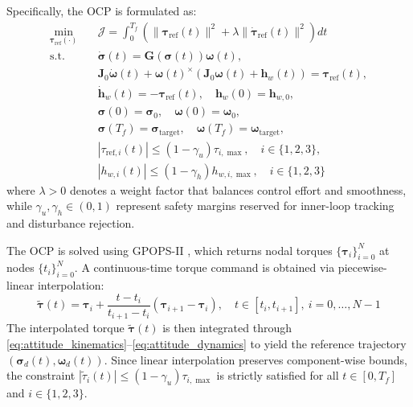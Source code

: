 \documentclass[journal]{new-aiaa}
\begin{document}
Specifically, the OCP is formulated as:
\begin{equation}
\begin{aligned}
\min_{\boldsymbol{\tau}_{\mathrm{ref}}(\cdot)} \quad &
\mathcal{J} = \int_0^{T_f} \left( \|\boldsymbol{\tau}_{\mathrm{ref}}(t)\|^2
+ \lambda \|\dot{\boldsymbol{\tau}}_{\mathrm{ref}}(t)\|^2 \right) dt \\[2pt]
\mathrm{s.t.}\quad
& \dot{\boldsymbol{\sigma}}(t) = \boldsymbol{G}(\boldsymbol{\sigma}(t)) \boldsymbol{\omega}(t), \\
& \boldsymbol{J}_0 \dot{\boldsymbol{\omega}}(t) + \boldsymbol{\omega}(t)^{\times}\!\left(\boldsymbol{J}_0 \boldsymbol{\omega}(t) + \boldsymbol{h}_w(t)\right) = \boldsymbol{\tau}_{\mathrm{ref}}(t), \\
& \dot{\boldsymbol{h}}_w(t) = -\boldsymbol{\tau}_{\mathrm{ref}}(t), \quad \boldsymbol{h}_w(0) = \boldsymbol{h}_{w,0}, \\[2pt]
& \boldsymbol{\sigma}(0) = \boldsymbol{\sigma}_0, \quad \boldsymbol{\omega}(0) = \boldsymbol{\omega}_0, \\[2pt]
& \boldsymbol{\sigma}(T_f) = \boldsymbol{\sigma}_{\mathrm{target}}, \quad \boldsymbol{\omega}(T_f) = \boldsymbol{\omega}_{\mathrm{target}}, \\[2pt]
& |{\tau}_{\mathrm{ref},i}(t)| \le (1-\gamma_u) \tau_{i,\max}, \quad i \in \{1,2,3\}, \\
& |h_{w,i}(t)| \le (1-\gamma_h) h_{w,i,\max}, \quad i \in \{1,2,3\}
\end{aligned}
\label{eq:OCP_slack}
\end{equation}
where $\lambda > 0$ denotes a weight factor that balances control effort and smoothness, while $\gamma_u, \gamma_h \in (0,1)$ represent safety margins reserved for inner-loop tracking and disturbance rejection.

The OCP is solved using GPOPS-II \cite{patterson_gpops-ii_2014},
which returns nodal torques $\{\boldsymbol{\tau}_i\}_{i=0}^N$ at nodes $\{t_i\}_{i=0}^N$. A continuous-time
torque command is obtained via piecewise-linear interpolation:
\begin{equation}
\tilde{\boldsymbol{\tau}}(t) = \boldsymbol{\tau}_i + \frac{t-t_i}{t_{i+1}-t_i}\left(\boldsymbol{\tau}_{i+1}-\boldsymbol{\tau}_i\right),
\quad t\in[t_i,t_{i+1}],\ i=0,\dots,N-1
\label{eq:linear_interpolation}
\end{equation}
The interpolated torque $\tilde{\boldsymbol{\tau}}(t)$ is then integrated through
\eqref{eq:attitude_kinematics}--\eqref{eq:attitude_dynamics} to yield the reference trajectory $(\boldsymbol{\sigma}_d(t),\boldsymbol{\omega}_d(t))$.
Since linear interpolation preserves component-wise bounds, the constraint $|\tilde{\tau}_i(t)| \le (1-\gamma_u) \tau_{i,\max}$ is strictly satisfied for all $t \in [0, T_f]$ and $i \in \{1,2,3\}$.
\end{document}
